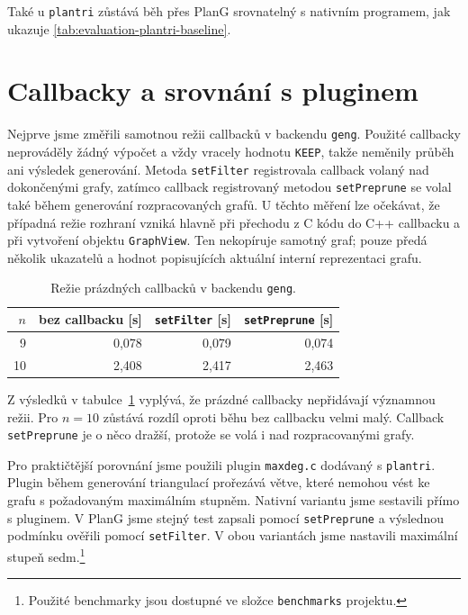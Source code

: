 Také u \texttt{plantri} zůstává běh přes PlanG srovnatelný s nativním programem,
jak ukazuje \cref{tab:evaluation-plantri-baseline}.

\section{Callbacky a srovnání s pluginem}
\label{sec:evaluation-callbacks}

Nejprve jsme změřili samotnou režii callbacků v backendu \texttt{geng}.
Použité callbacky neprováděly žádný výpočet a vždy vracely hodnotu
\texttt{KEEP}, takže neměnily průběh ani výsledek generování. Metoda
\texttt{setFilter} registrovala callback volaný nad dokončenými grafy, zatímco
callback registrovaný metodou \texttt{setPreprune} se volal také během
generování rozpracovaných grafů. U těchto měření lze očekávat, že případná
režie rozhraní vzniká hlavně při přechodu z C kódu do C++ callbacku a při
vytvoření objektu \texttt{GraphView}. Ten nekopíruje samotný graf; pouze předá
několik ukazatelů a hodnot popisujících aktuální interní reprezentaci grafu.

\begin{table}[htbp]
\centering
\begin{tabular}{rrrr}
\toprule
\(n\) & bez callbacku [s] & \texttt{setFilter} [s] & \texttt{setPreprune} [s] \\
\midrule
9  & 0{,}078 & 0{,}079 & 0{,}074 \\
10 & 2{,}408 & 2{,}417 & 2{,}463 \\
\bottomrule
\end{tabular}
\caption{Režie prázdných callbacků v backendu \texttt{geng}.}
\label{tab:evaluation-geng-callback-overhead}
\end{table}

Z výsledků v tabulce~\ref{tab:evaluation-geng-callback-overhead} vyplývá, že prázdné
callbacky nepřidávají významnou režii. Pro \(n = 10\) zůstává rozdíl oproti
běhu bez callbacku velmi malý. Callback \texttt{setPreprune} je o něco dražší,
protože se volá i nad rozpracovanými grafy.

Pro praktičtější porovnání jsme použili plugin \texttt{maxdeg.c} dodávaný s
\texttt{plantri}. Plugin během generování triangulací prořezává větve, které
nemohou vést ke grafu s požadovaným maximálním stupněm. Nativní variantu jsme
sestavili přímo s pluginem. V PlanG jsme stejný test zapsali pomocí
\texttt{setPreprune} a výslednou podmínku ověřili pomocí \texttt{setFilter}.
V obou variantách jsme nastavili maximální stupeň sedm.\footnote{Použité
benchmarky jsou dostupné ve složce \texttt{benchmarks} projektu.}

